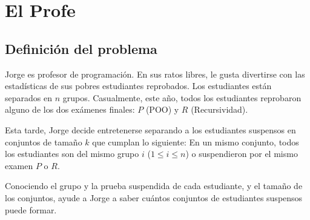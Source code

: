 \documentclass{article}
\begin{document}
	\section{El Profe}

	\subsection{Definición del problema}
	Jorge es profesor de programación. En sus ratos libres, le gusta divertirse con las estadísticas de sus pobres estudiantes reprobados. Los estudiantes están separados en $n$ grupos. Casualmente, este año, todos los estudiantes reprobaron alguno de los dos exámenes finales: $P$ (POO) y $R$ (Recursividad).

Esta tarde, Jorge decide entretenerse separando a los estudiantes suspensos en conjuntos de tamaño $k$ que cumplan lo siguiente: En un mismo conjunto, todos los estudiantes son del mismo grupo $i$ ($1 \leq i \leq n$) o suspendieron por el mismo examen $P$ o $R$.

Conociendo el grupo y la prueba suspendida de cada estudiante, y el tamaño de los conjuntos, ayude a Jorge a saber cuántos conjuntos de estudiantes suspensos puede formar.
\end{document}

